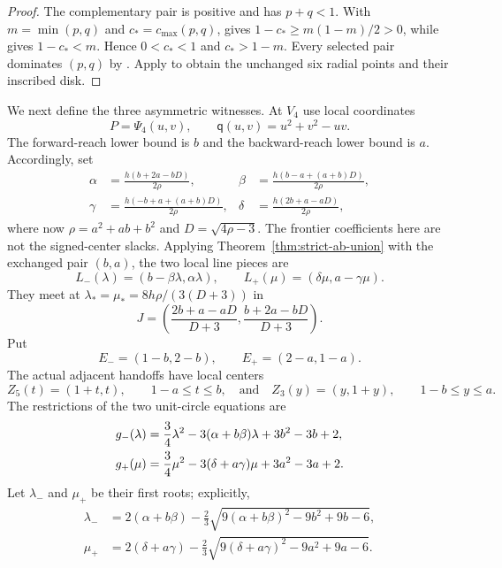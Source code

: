 \begin{proof}
The complementary pair is positive and has $p+q<1$.
With $m=\min(p,q)$ and $c_*=c_{\max}(p,q)$,  gives
$1-c_*\ge m(1-m)/2>0$, while
 gives $1-c_*<m$.
Hence $0<c_*<1$ and $c_*>1-m$.
Every selected pair dominates $(p,q)$ by .
Apply  to obtain the unchanged
six radial points and their inscribed disk.
\end{proof}

We next define the three asymmetric witnesses.  At $V_4$ use local
coordinates
\[
 P=\Psi_4(u,v),\qquad
 \mathsf q(u,v)=u^2+v^2-uv.
\]
The forward-reach lower bound is $b$ and the backward-reach lower bound is $a$.  Accordingly,
set
\begin{align*}
 \alpha&=\frac{h(b+2a-bD)}{2\rho},&
 \beta&=\frac{h(b-a+(a+b)D)}{2\rho},\\
 \gamma&=\frac{h(-b+a+(a+b)D)}{2\rho},&
 \delta&=\frac{h(2b+a-aD)}{2\rho},
\end{align*}
where now $\rho=a^2+ab+b^2$ and $D=\sqrt{4\rho-3}$.  The frontier coefficients here are not the signed-center slacks.
Applying Theorem~\ref{thm:strict-ab-union} with the exchanged pair $(b,a)$,
the two local line pieces are
\[
 L_-(\lambda)=(b-\beta\lambda,\alpha\lambda),\qquad
 L_+(\mu)=(\delta\mu,a-\gamma\mu).
\]
They meet at $\lambda_* =\mu_*=8h\rho/(3(D+3))$ in
\begin{equation}
 J=\left(\frac{2b+a-aD}{D+3},
          \frac{b+2a-bD}{D+3}\right).           \label{eq:line-junction}
\end{equation}
Put
\[
 E_-=(1-b,2-b),\qquad E_+=(2-a,1-a).
\]
The actual adjacent handoffs have local centers
\[
 Z_5(t)=(1+t,t),\qquad 1-a\le t\le b,
 \quad\text{and}\quad
 Z_3(y)=(y,1+y),\qquad 1-b\le y\le a.
\]
The restrictions of the two unit-circle equations are
\begin{align}
 g_-(\lambda)&=\frac34\lambda^2
 -3(\alpha+b\beta)\lambda+3b^2-3b+2,\notag\\
 g_+(\mu)&=\frac34\mu^2
 -3(\delta+a\gamma)\mu+3a^2-3a+2.              \label{eq:witness-quadratics}
\end{align}
Let $\lambda_-$ and $\mu_+$ be their first roots; explicitly,
\begin{align*}
 \lambda_-&=2(\alpha+b\beta)
 -\frac23\sqrt{9(\alpha+b\beta)^2-9b^2+9b-6},\\
 \mu_+&=2(\delta+a\gamma)
 -\frac23\sqrt{9(\delta+a\gamma)^2-9a^2+9a-6}.
\end{align*}

